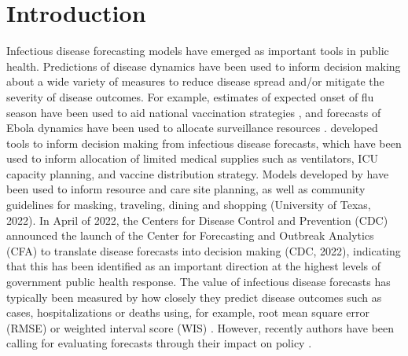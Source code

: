 \documentclass{article}\usepackage[]{graphicx}\usepackage[]{xcolor}
\begin{document}
\section{Introduction}

Infectious disease forecasting models have emerged as important tools in public health. Predictions of disease dynamics have been used to inform decision making about a wide variety of measures to reduce disease spread and/or mitigate the severity of disease outcomes. For example, estimates of expected onset of flu season have been used to aid national vaccination strategies \citep{igboh2023timing}, and forecasts of Ebola dynamics have been used to allocate surveillance resources \citep{meltzer2014estimating, rainisch2015regional}. \cite{bertsimas2021predictionsCOVID} developed tools to inform decision making from infectious disease forecasts, which have been used to inform allocation of limited medical supplies such as ventilators, ICU capacity planning, and vaccine distribution strategy. Models developed by \cite{fox_real-time_2022} have been used to inform resource and care site planning, as well as community guidelines for masking, traveling, dining and shopping (University of Texas, 2022)\nocite{utnews2022}. In April of 2022, the Centers for Disease Control and Prevention (CDC) announced the launch of the Center for Forecasting and Outbreak Analytics (CFA) to translate disease forecasts into decision making (CDC, 2022)\nocite{cdc2022cfa}, indicating that this has been identified as an important direction at the highest levels of government public health response. The value of infectious disease forecasts has typically been measured by how closely they predict disease outcomes such as cases, hospitalizations or deaths using, for example, root mean square error (RMSE) \citep{papastefanopoulos2020covid} or weighted interval score (WIS) \citep{bracher2021evaluating}.  However, recently authors have been calling for evaluating forecasts through their impact on policy \citep{marshall2023predictions, bilinski_adaptive_2023}.
\end{document}
